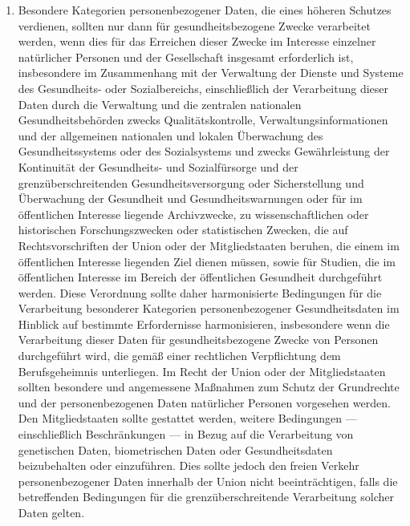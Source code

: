 \begin{enumerate}
   \item Besondere Kategorien personenbezogener Daten, die eines höheren Schutzes verdienen, sollten nur dann für
    gesundheitsbezogene Zwecke verarbeitet werden, wenn dies für das Erreichen dieser Zwecke im Interesse einzelner
    natürlicher Personen und der Gesellschaft insgesamt erforderlich ist, insbesondere im Zusammenhang mit der
    Verwaltung der Dienste und Systeme des Gesundheits- oder Sozialbereichs, einschließlich der Verarbeitung dieser
    Daten durch die Verwaltung und die zentralen nationalen Gesundheitsbehörden zwecks Qualitätskontrolle,
    Verwaltungsinformationen und der allgemeinen nationalen und lokalen Überwachung des Gesundheitssystems oder des
    Sozialsystems und zwecks Gewährleistung der Kontinuität der Gesundheits- und Sozialfürsorge und der
    grenzüberschreitenden Gesundheitsversorgung oder Sicherstellung und Überwachung der Gesundheit und
    Gesundheitswarnungen oder für im öffentlichen Interesse liegende Archivzwecke, zu wissenschaftlichen oder
    historischen Forschungszwecken oder statistischen Zwecken, die auf Rechtsvorschriften der Union oder der
    Mitgliedstaaten beruhen, die einem im öffentlichen Interesse liegenden Ziel dienen müssen, sowie für Studien, die
    im öffentlichen Interesse im Bereich der öffentlichen Gesundheit durchgeführt werden. Diese Verordnung sollte daher
    harmonisierte Bedingungen für die Verarbeitung besonderer Kategorien personenbezogener Gesundheitsdaten im Hinblick
    auf bestimmte Erfordernisse harmonisieren, insbesondere wenn die Verarbeitung dieser Daten für gesundheitsbezogene
    Zwecke von Personen durchgeführt wird, die gemäß einer rechtlichen Verpflichtung dem Berufsgeheimnis unterliegen.
    Im Recht der Union oder der Mitgliedstaaten sollten besondere und angemessene Maßnahmen zum Schutz der Grundrechte
    und der personenbezogenen Daten natürlicher Personen vorgesehen werden. Den Mitgliedstaaten sollte gestattet
    werden, weitere Bedingungen — einschließlich Beschränkungen — in Bezug auf die Verarbeitung von genetischen Daten,
    biometrischen Daten oder Gesundheitsdaten beizubehalten oder einzuführen. Dies sollte jedoch den freien Verkehr
    personenbezogener Daten innerhalb der Union nicht beeinträchtigen, falls die betreffenden Bedingungen für die
    grenzüberschreitende Verarbeitung solcher Daten gelten.%
   \label{itm:eg-53}
   


\end{enumerate}
